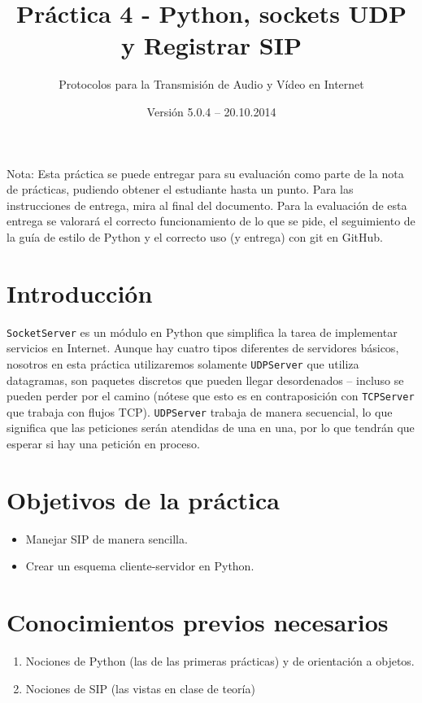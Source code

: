 \documentclass[11pt,a4paper]{article}
\begin{document}
\title{Práctica 4 - Python, sockets UDP y Registrar SIP}
\author{Protocolos para la Transmisión de Audio y Vídeo en Internet}
\date{Versión 5.0.4 – 20.10.2014}


\maketitle

Nota: Esta práctica se puede entregar para su evaluación como parte de la nota de prácticas, pudiendo obtener el estudiante hasta un punto. Para las instrucciones de entrega, mira al final del documento. Para la evaluación de esta entrega se valorará el correcto funcionamiento de lo que se pide, el seguimiento de la guía de estilo de Python y el correcto uso (y entrega) con git en GitHub.

\section{Introducción}

\texttt{SocketServer} es un módulo en Python que simplifica la tarea de implementar servicios en Internet. Aunque hay cuatro tipos diferentes de servidores básicos, nosotros en esta práctica utilizaremos solamente \texttt{UDPServer} que utiliza datagramas, son paquetes discretos que pueden llegar desordenados – incluso se pueden perder por el camino (nótese que esto es en contraposición con \texttt{TCPServer} que trabaja con flujos TCP). \texttt{UDPServer} trabaja de manera secuencial, lo que significa que las peticiones serán atendidas de una en una, por lo que tendrán que esperar si hay una petición en proceso.

\section{Objetivos de la práctica}

\begin{itemize}
  \item Manejar SIP de manera sencilla.
  \item Crear un esquema cliente-servidor en Python.
\end{itemize}

\section{Conocimientos previos necesarios}

\begin{enumerate}
  \item Nociones de Python (las de las primeras prácticas) y de orientación a objetos.
  \item Nociones de SIP (las vistas en clase de teoría)
\end{enumerate}
\end{document}

